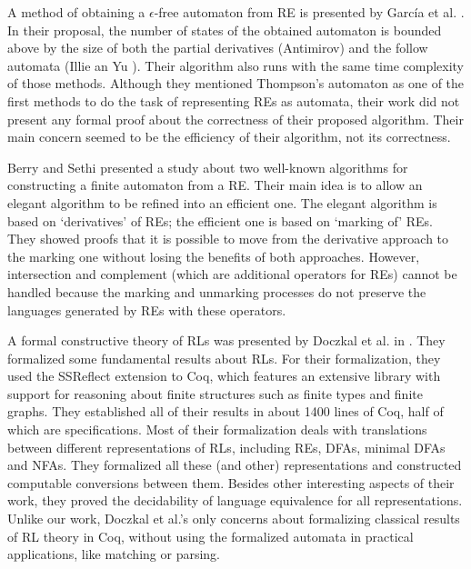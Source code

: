 \documentclass[oneside,12pt]{scrbook}
\theoremstyle{definition}
\theoremstyle{plain}
\theoremstyle{definition}
\begin{document}
A method of obtaining a $\epsilon$-free automaton from RE is presented by García et al. \cite{Garcia2011}. In their proposal, the number of states of the obtained automaton is bounded above by the size of both the partial derivatives (Antimirov) and the follow automata (Illie an Yu \cite{Ilie2003}). Their algorithm also runs with the same time complexity of those methods. Although they mentioned Thompson's automaton as one of the first methods to do the task of representing REs as automata, their work did not present any formal proof about the correctness of their proposed algorithm. Their main concern seemed to be the efficiency of their algorithm, not its correctness.

Berry and Sethi \cite{Berry1986} presented a study about two well-known algorithms for constructing a finite automaton from a RE. Their main idea is to allow an elegant algorithm to be refined into an efficient one. The elegant algorithm is based on `derivatives' of REs; the efficient one is based on `marking of' REs. They showed proofs that it is possible to move from the derivative approach to the marking one without losing the benefits of both approaches. However, intersection and complement (which are additional operators for REs) cannot be handled because the marking and unmarking processes do not preserve the languages generated by REs with these operators.

A formal constructive theory of RLs was presented by Doczkal et al. in \cite{Doczkal2013}. They formalized some fundamental results about RLs. For their formalization, they used the SSReflect extension to Coq, which features an extensive library with support for reasoning about finite structures such as finite types and finite graphs. They established all of their results in about 1400 lines of Coq, half of which are specifications. Most of their formalization deals with translations between different representations of RLs, including REs, DFAs, minimal DFAs and NFAs. They formalized all these (and other) representations and constructed computable conversions between them. Besides other interesting aspects of their work, they proved the decidability of language equivalence for all representations. Unlike our work, Doczkal et al.'s only concerns about formalizing classical results of RL theory in Coq, without using the formalized automata in practical applications, like matching or parsing.  
\end{document}

